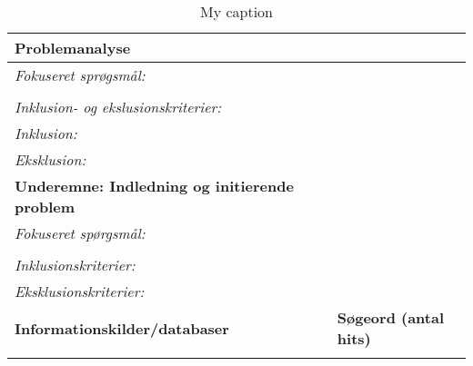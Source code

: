 \begin{table}[H]
\centering
\caption{My caption}
\label{my-label}
\begin{tabular}{|ll|}
\hline
\rowcolor[HTML]{656565} 
{\color[HTML]{000000} \textbf{Problemanalyse}}                                     & {\color[HTML]{656565} }                              \\ \hline
\textit{Fokuseret sprøgsmål:}                                                      &                                                      \\
                                                                                   &                                                      \\
\textit{Inklusion- og ekslusionskriterier:}                                        &                                                      \\
\textit{Inklusion:}                                                                &                                                      \\
\textit{Eksklusion:}                                                               &                                                      \\ \hline
\rowcolor[HTML]{C0C0C0} 
{\color[HTML]{000000} \textbf{Underemne: Indledning og initierende problem}}       & {\color[HTML]{C0C0C0} }                              \\ \hline
\textit{Fokuseret spørgsmål:}                                                      &                                                      \\
                                                                                   &                                                      \\
\textit{Inklusionskriterier:}                                                      &                                                      \\
\textit{Eksklusionskriterier:}                                                     &                                                      \\ \hline
\multicolumn{1}{|l|}{{\color[HTML]{000000} \textbf{Informationskilder/databaser}}} & {\color[HTML]{000000} \textbf{Søgeord (antal hits)}} \\ \hline
\multicolumn{1}{|l|}{}                                                             &                                                      \\ \hline

\end{tabular}
\end{table}
